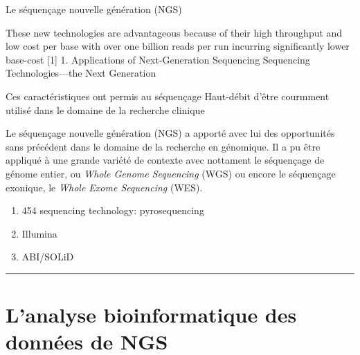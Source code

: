 \documentclass[12pt,twoside]{reedthesis}
\providecommand{\tightlist}{%
  \setlength{\itemsep}{0pt}\setlength{\parskip}{0pt}}
\theoremstyle{definition}
\theoremstyle{definition}
\theoremstyle{remark}
\begin{document}
  Le séquençage nouvelle génération (NGS)
  
  These new technologies are advantageous because of their high throughput
  and low cost per base with over one billion reads per run incurring
  significantly lower base-cost {[}1{]} 1. Applications of Next-Generation
  Sequencing Sequencing Technologies---the Next Generation
  
  Ces caractéristiques ont permis au séquençage Haut-débit d'être
  courmment utilisé dans le domaine de la recherche clinique
  
  Le séquençage nouvelle génération (NGS) a apporté avec lui des
  opportunités sans précédent dans le domaine de la recherche en
  génomique. Il a pu être appliqué à une grande variété de contexte avec
  nottament le séquençage de génome entier, ou \emph{Whole Genome
  Sequencing} (WGS) ou encore le séquençage exonique, le \emph{Whole Exome
  Sequencing} (WES).
  
  \begin{enumerate}
  \def\labelenumi{\arabic{enumi}.}
  \tightlist
  \item
    454 sequencing technology: pyrosequencing
  \item
    Illumina\\
  \item
    ABI/SOLiD
  \end{enumerate}
  
  \begin{center}\rule{0.5\linewidth}{\linethickness}\end{center}
  
  \section{L'analyse bioinformatique des données de
  NGS}\label{lanalyse-bioinformatique-des-donnees-de-ngs}
  
\end{document}
